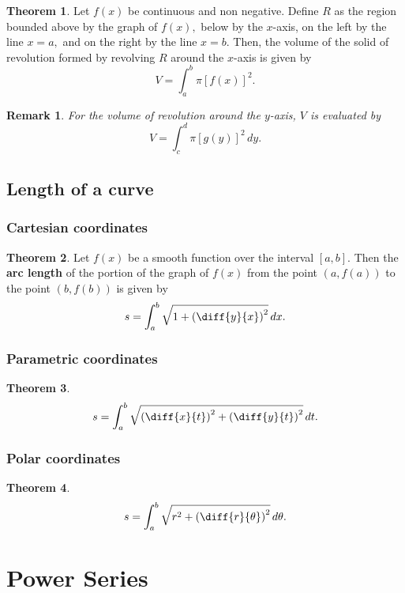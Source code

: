 \documentclass[12pt, a4paper]{article}
\newtheorem*{remark}{Remark}
\theoremstyle{definition}
\newtheorem{theorem}{Theorem}[section]
\theoremstyle{plain}
\begin{document}
\begin{theorem}
Let $f(x)$ be continuous and non negative. Define $R$ as the region bounded above by the graph of $f(x),$ below by the $x$-axis, on the left by the line $x = a,$ and on the right by the line $x = b.$ Then, the volume of the solid of revolution formed by revolving $R$ around the $x$-axis is given by $$V=\int_a^b \pi \left[f(x)\right]^2.$$
\end{theorem}

\begin{remark}
For the volume of revolution around the $y$-axis, $V$ is evaluated by $$V=\int_c^d \pi\left[g(y)\right]^2 \, dy.$$
\end{remark}

\subsection{Length of a curve}

\subsubsection{Cartesian coordinates}

\begin{theorem}
Let $f(x)$ be a smooth function over the interval $[a, b].$ Then the \textbf{arc length} of the portion of the graph of $f(x)$ from the point $(a, f (a))$ to the point $(b, f (b))$ is given by $$s=\int_a^b \sqrt{1+\left(\diff{y}{x}\right)^2} \, dx.$$
\end{theorem}

\subsubsection{Parametric coordinates}

\begin{theorem}
$$s=\int_a^b \sqrt{\left(\diff{x}{t}\right)^2+\left(\diff{y}{t}\right)^2} \, dt.$$
\end{theorem}

\subsubsection{Polar coordinates}

\begin{theorem}
$$s=\int_a^b \sqrt{r^2+\left(\diff{r}{\theta}\right)^2} \, d\theta.$$
\end{theorem}

\section{Power Series}
\end{document}
